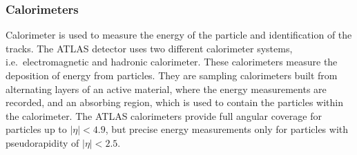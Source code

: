 \subsubsection{Calorimeters}%
\label{sec:lhcandatlas:atlas:calorimeters}
Calorimeter is used to measure the energy of the particle and identification of the tracks. The ATLAS detector uses two different calorimeter systems, i.e.\ electromagnetic and hadronic calorimeter. These calorimeters measure the deposition of energy from particles. They are sampling calorimeters built from alternating layers of an active material, where the energy measurements are recorded, and an absorbing region, which is used to contain the particles within the calorimeter. The ATLAS calorimeters provide full angular coverage for particles up to $|\eta|<4.9$, but precise energy measurements only for particles with pseudorapidity of $|\eta|<2.5$.~\cite{atlas}

